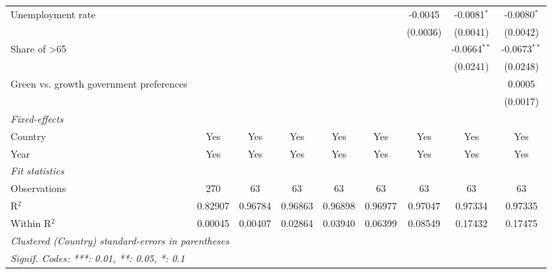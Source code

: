 \begin{table}[htbp]
\begin{tabular}{lcccccccc}
      Unemployment rate                                       &          &          &          &          &          & -0.0045  & -0.0081$^{*}$  & -0.0080$^{*}$\\   
                                                              &          &          &          &          &          & (0.0036) & (0.0041)       & (0.0042)\\   
      Share of >65                                            &          &          &          &          &          &          & -0.0664$^{**}$ & -0.0673$^{**}$\\   
                                                              &          &          &          &          &          &          & (0.0241)       & (0.0248)\\   
      Green vs. growth government preferences                 &          &          &          &          &          &          &                & 0.0005\\   
                                                              &          &          &          &          &          &          &                & (0.0017)\\   
      \midrule
      \emph{Fixed-effects}\\
      Country                                                 & Yes      & Yes      & Yes      & Yes      & Yes      & Yes      & Yes            & Yes\\  
      Year                                                    & Yes      & Yes      & Yes      & Yes      & Yes      & Yes      & Yes            & Yes\\  
      \midrule
      \emph{Fit statistics}\\
      Observations                                            & 270      & 63       & 63       & 63       & 63       & 63       & 63             & 63\\  
      R$^2$                                                   & 0.82907  & 0.96784  & 0.96863  & 0.96898  & 0.96977  & 0.97047  & 0.97334        & 0.97335\\  
      Within R$^2$                                            & 0.00045  & 0.00407  & 0.02864  & 0.03940  & 0.06399  & 0.08549  & 0.17432        & 0.17475\\  
      \midrule \midrule
      \multicolumn{9}{l}{\emph{Clustered (Country) standard-errors in parentheses}}\\
      \multicolumn{9}{l}{\emph{Signif. Codes: ***: 0.01, **: 0.05, *: 0.1}}\\
   \end{tabular}
\end{table}


